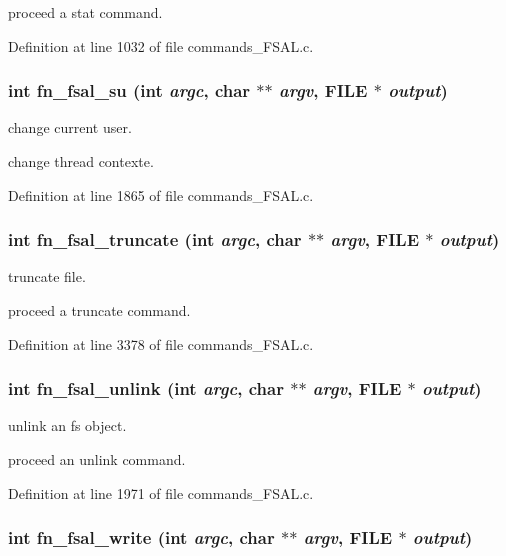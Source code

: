 proceed a stat command. 

Definition at line 1032 of file commands\_\-FSAL.c.
\subsubsection[{fn\_\-fsal\_\-su}]{\setlength{\rightskip}{0pt plus 5cm}int fn\_\-fsal\_\-su (int {\em argc}, \/  char $\ast$$\ast$ {\em argv}, \/  FILE $\ast$ {\em output})}\label{commands_8h_8b60c5a24b06782c3a35897b0e4de143}


change current user.

change thread contexte. 

Definition at line 1865 of file commands\_\-FSAL.c.
\subsubsection[{fn\_\-fsal\_\-truncate}]{\setlength{\rightskip}{0pt plus 5cm}int fn\_\-fsal\_\-truncate (int {\em argc}, \/  char $\ast$$\ast$ {\em argv}, \/  FILE $\ast$ {\em output})}\label{commands_8h_d1e4eaf9bc2a2c768edee9550533f8fc}


truncate file.

proceed a truncate command. 

Definition at line 3378 of file commands\_\-FSAL.c.
\subsubsection[{fn\_\-fsal\_\-unlink}]{\setlength{\rightskip}{0pt plus 5cm}int fn\_\-fsal\_\-unlink (int {\em argc}, \/  char $\ast$$\ast$ {\em argv}, \/  FILE $\ast$ {\em output})}\label{commands_8h_8dbde159a7a808f5fc63ee46bfbb0aa2}


unlink an fs object.

proceed an unlink command. 

Definition at line 1971 of file commands\_\-FSAL.c.
\subsubsection[{fn\_\-fsal\_\-write}]{\setlength{\rightskip}{0pt plus 5cm}int fn\_\-fsal\_\-write (int {\em argc}, \/  char $\ast$$\ast$ {\em argv}, \/  FILE $\ast$ {\em output})}\label{commands_8h_4874930678cbb1e7a19e0bab498f5a4c}


